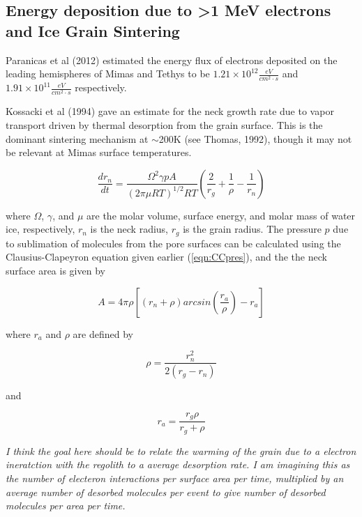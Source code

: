 \documentclass[11pt]{article} %
\begin{document}
\begin{itemize}
\section{Energy deposition due to >1 MeV electrons and Ice Grain Sintering}

	Paranicas et al (2012) estimated the energy flux of electrons deposited on the leading hemispheres of Mimas and Tethys to be $1.21\times 10^{12} \frac{eV}{cm^{2}\cdot s}$ and $1.91\times 10^{11} \frac{eV}{cm^{2}\cdot s}$ respectively.
	
	Kossacki et al (1994) gave an estimate for the neck growth rate due to vapor transport driven by thermal desorption from the grain surface. This is the dominant sintering mechanism at $\sim$200K (see Thomas, 1992), though it may not be relevant at Mimas surface temperatures.
	
	\begin{equation}
	\frac{dr_{n}}{dt} = \frac{\Omega^{2}\gamma p A}{(2\pi\mu RT)^{1/2}RT} \left( \frac{2}{r_{g}} + \frac{1}{\rho} - \frac{1}{r_{n}} \right)
	\end{equation}
	
	where $\Omega$, $\gamma$, and $\mu$ are the molar volume, surface energy, and molar mass of water ice, respectively, $r_{n}$ is the neck radius, $r_{g}$ is the grain radius. The pressure $p$ due to sublimation of molecules from the pore surfaces can be calculated using the Clausius-Clapeyron equation given earlier (\ref{eqn:CCpres}), and the the neck surface area is given by
	
	\begin{equation}
	A = 4\pi\rho \left[ (r_{n} + \rho)arcsin\left(\frac{r_{a}}{\rho}\right) - r_{a} \right]
	\end{equation}
	
	where $r_{a}$ and $\rho$ are defined by
	
	\begin{equation}
	\rho = \frac{r_{n}^{2}}{2(r_{g}-r_{n})}
	\end{equation}
	
	and
	
	\begin{equation}
	 r_{a} = \frac{r_{g}\rho}{r_{g}+\rho}
	\end{equation}
	
	\emph{I think the goal here should be to relate the warming of the grain due to a electron ineratction with the regolith to a average desorption rate. I am imagining this as the number of electeron interactions per surface area per time, multiplied by an average number of desorbed molecules per event to give number of desorbed molecules per area per time.}
	

\end{itemize}
\end{document}
